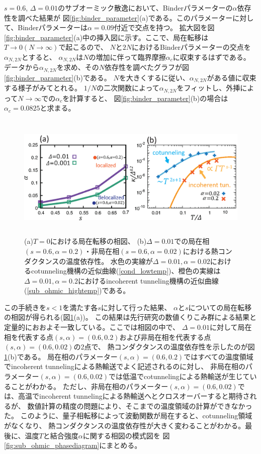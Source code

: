 $s=0.6$, $\Delta=0.01$のサブオーミック散逸において、Binderパラメーターの$\alpha$依存性を調べた結果が
図\ref{fig:binder_parameter}(a)である。このパラメーターに対して、Binderパラメーターは$\alpha=0.09$付近で交点を持つ。
拡大図を図\ref{fig:binder_parameter}(a)中の挿入図に示す。ここで、局在転移は$T\rightarrow0(N\rightarrow\infty)$で起こるので、
$N$と$2N$におけるBinderパラメーターの交点を$\alpha_{N,2N}$とすると、
$\alpha_{N,2N}$は$N$の増加に伴って臨界摩擦$\alpha_c$に収束するはずである。
データから$\alpha_{N,2N}$を求め、その$N$依存性を調べたグラフが図\ref{fig:binder_parameter}(b)である。
$N$を大きくするに従い、$\alpha_{N,2N}$がある値に収束する様子がみてとれる。
$1/N$の二次関数によって$\alpha_{N,2N}$をフィットし、外挿によって$N\rightarrow\infty$での$\alpha_c$を計算すると、
図\ref{fig:binder_parameter}(b)の場合は$\alpha_c=0.0825$と求まる。

\begin{figure}[tb]
	\centering
	\includegraphics[height=6.0cm]{localization_phasediagram.eps}
	\caption{
	(a)$T=0$における局在転移の相図、 (b)$\Delta=0.01$での局在相$(s=0.6,\alpha=0.2)$・非局在相$(s=0.6,\alpha=0.02)$における熱コンダクタンスの温度依存性。
	水色の実線が$\Delta=0.01,\alpha=0.02$におけるcotunneling機構の近似曲線(\ref{cond_lowtemp})、橙色の実線は$\Delta=0.01,\alpha=0.2$におけるincoherent tunneling機構の近似曲線(\ref{sub_ohmic_hightemp})である。
	}
	\label{fig:localization_phasediagram}
\end{figure}

この手続きを$s<1$を満たす各$s$に対して行った結果、 $\alpha$と$s$についての局在転移の相図が得られる(図\ref{fig:localization_phasediagram}(a))。
この結果は先行研究の数値くりこみ群による結果\cite{Vojta05}と定量的におおよそ一致している。ここでは相図の中で、
$\Delta=0.01$に対して局在相を代表する点$(s,\alpha) = (0.6,0.2)$および非局在相を代表する点$(s,\alpha) = (0.6,0.02)$の2点で、
熱コンダクタンスの温度依存性を示したのが図\ref{fig:localization_phasediagram}(b)である。
局在相のパラメーター$(s,\alpha) = (0.6,0.2)$ではすべての温度領域でincoherent tunnelingによる熱輸送でよく記述されるのに対し、
非局在相のパラメーター$(s,\alpha) = (0.6,0.02)$では低温でcotunnelingによる熱輸送が生じていることがわかる。
ただし、非局在相のパラメーター$(s,\alpha) = (0.6,0.02)$では、高温でincoherent tunnelingによる熱輸送へとクロスオーバーすると期待されるが、
数値計算の精度の問題により、そこまでの温度領域の計算ができなかった。
このように、量子相転移によって波動関数が局在すると、cotunneling領域がなくなり、
熱コンダクタンスの温度依存性が大きく変わることがわかる。最後に、温度$T$と結合強度$\alpha$に関する相図の模式図を
図\ref{fig:sub_ohmic_phasediagram}にまとめる。


